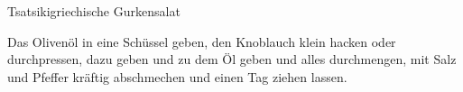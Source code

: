 \begin{recipe}{Tsatsiki}{griechische Gurkensalat}
  \inglist

  \steps
  Das Olivenöl in eine Schüssel geben, den Knoblauch klein hacken oder durchpressen,
  dazu geben und zu dem Öl geben und alles durchmengen, mit Salz und Pfeffer kräftig
  abschmechen und einen Tag ziehen lassen.
\end{recipe}
